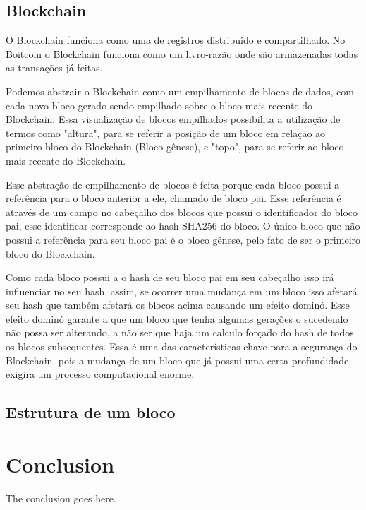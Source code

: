\documentclass[conference,compsoc]{IEEEtran}
\begin{document}
\subsection{Blockchain}
O Blockchain funciona como uma de registros distribuido e compartilhado. No Boitcoin o Blockchain funciona como um livro-razão onde são armazenadas todas as transações já feitas.

Podemos abstrair o Blockchain como um empilhamento de blocos de dados, com cada  novo bloco gerado sendo empilhado sobre o bloco mais recente do Blockchain. Essa visualização de blocos empilhados possibilita a utilização de termos como "altura", para se referir a posição de um bloco em relação ao primeiro bloco do Blockchain (Bloco gênese), e "topo", para se referir ao bloco mais recente do Blockchain. 

Esse abstração de empilhamento de blocos é feita porque cada bloco possui a referência para o bloco anterior a ele, chamado de bloco pai. Esse referência é através de um campo no cabeçalho dos blocos que possui o identificador do bloco pai, esse identificar corresponde ao hash SHA256 do bloco.  O único bloco que não possui a referência para seu bloco pai é o bloco gênese, pelo fato de ser o primeiro bloco do Blockchain.

Como cada bloco possui a o hash de seu bloco pai em seu cabeçalho isso irá influenciar no seu hash, assim, se ocorrer uma mudança em um bloco isso afetará seu hash que também afetará os blocos acima causando um efeito dominó. Esse efeito dominó garante a  que um bloco que tenha algumas gerações o sucedendo não possa ser alterando, a não ser que haja um calculo forçado do hash de todos os blocos subsequentes. Essa é uma das características chave para a segurança do Blockchain, pois a mudança de um bloco que já possui uma certa profundidade exigira um processo computacional enorme.



\subsection*{Estrutura de um bloco}

\section{Conclusion}
The conclusion goes here.




\end{document}
